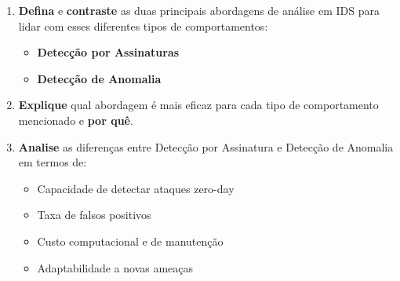 \begin{enumerate}
    \item \textbf{Defina} e \textbf{contraste} as duas principais abordagens de análise em IDS para lidar com esses diferentes tipos de comportamentos:
          \begin{itemize}
              \item \textbf{Detecção por Assinaturas}
              \item \textbf{Detecção de Anomalia}
          \end{itemize}
    \item \textbf{Explique} qual abordagem é mais eficaz para cada tipo de comportamento mencionado e \textbf{por quê}.
    \item \textbf{Analise} as diferenças entre Detecção por Assinatura e Detecção de Anomalia em termos de:
          \begin{itemize}
              \item Capacidade de detectar ataques zero-day
              \item Taxa de falsos positivos
              \item Custo computacional e de manutenção
              \item Adaptabilidade a novas ameaças
          \end{itemize}

\end{enumerate}

